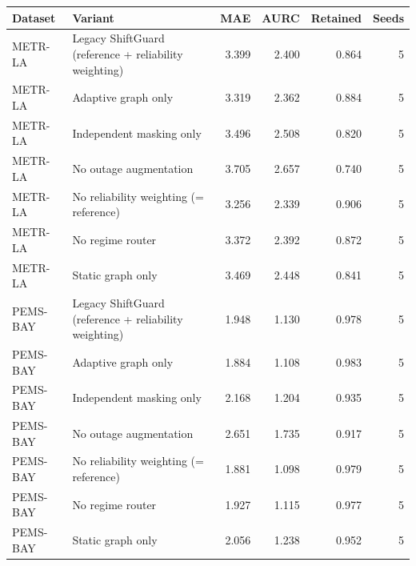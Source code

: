 \begin{tabular}{llrrrr}
\toprule
Dataset & Variant & MAE & AURC & Retained & Seeds \\
\midrule
METR-LA & Legacy ShiftGuard (reference + reliability weighting) & 3.399 & 2.400 & 0.864 & 5 \\
METR-LA & Adaptive graph only & 3.319 & 2.362 & 0.884 & 5 \\
METR-LA & Independent masking only & 3.496 & 2.508 & 0.820 & 5 \\
METR-LA & No outage augmentation & 3.705 & 2.657 & 0.740 & 5 \\
METR-LA & No reliability weighting (= reference) & 3.256 & 2.339 & 0.906 & 5 \\
METR-LA & No regime router & 3.372 & 2.392 & 0.872 & 5 \\
METR-LA & Static graph only & 3.469 & 2.448 & 0.841 & 5 \\
PEMS-BAY & Legacy ShiftGuard (reference + reliability weighting) & 1.948 & 1.130 & 0.978 & 5 \\
PEMS-BAY & Adaptive graph only & 1.884 & 1.108 & 0.983 & 5 \\
PEMS-BAY & Independent masking only & 2.168 & 1.204 & 0.935 & 5 \\
PEMS-BAY & No outage augmentation & 2.651 & 1.735 & 0.917 & 5 \\
PEMS-BAY & No reliability weighting (= reference) & 1.881 & 1.098 & 0.979 & 5 \\
PEMS-BAY & No regime router & 1.927 & 1.115 & 0.977 & 5 \\
PEMS-BAY & Static graph only & 2.056 & 1.238 & 0.952 & 5 \\
\bottomrule
\end{tabular}

